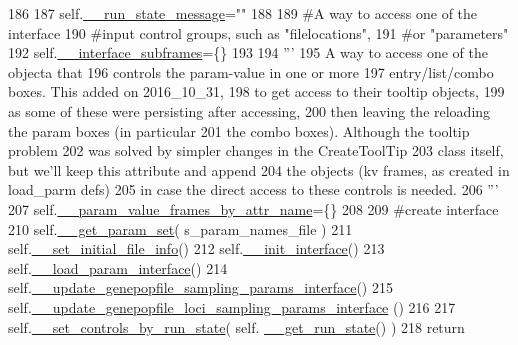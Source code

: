 \begin{DoxyCode}
186 
187         self.\hyperlink{classnegui_1_1pgguineestimator__experimental_1_1PGGuiNeEstimator_adc90b53fb2b4c9aefbcc0391ce7451d7}{\_\_run\_state\_message}=\textcolor{stringliteral}{""}
188 
189         \textcolor{comment}{#A way to access one of the interface}
190         \textcolor{comment}{#input control groups, such as "filelocations",}
191         \textcolor{comment}{#or "parameters"}
192         self.\hyperlink{classnegui_1_1pgguineestimator__experimental_1_1PGGuiNeEstimator_a363d1b1d4e38372e920f732bfe834b5c}{\_\_interface\_subframes}=\{\}
193 
194         \textcolor{stringliteral}{'''}
195 \textcolor{stringliteral}{        A way to access one of the objecta that}
196 \textcolor{stringliteral}{        controls the param-value in one or more }
197 \textcolor{stringliteral}{        entry/list/combo boxes.  This added on 2016\_10\_31, }
198 \textcolor{stringliteral}{        to get access to their tooltip objects,         }
199 \textcolor{stringliteral}{        as some of these were persisting after accessing,}
200 \textcolor{stringliteral}{        then leaving the reloading the param boxes (in particular}
201 \textcolor{stringliteral}{        the combo boxes). Although the tooltip problem}
202 \textcolor{stringliteral}{        was solved by simpler changes in the CreateToolTip}
203 \textcolor{stringliteral}{        class itself, but we'll keep this attribute and append}
204 \textcolor{stringliteral}{        the objects (kv frames, as created in load\_parm defs)}
205 \textcolor{stringliteral}{        in case the direct access to these controls is needed.}
206 \textcolor{stringliteral}{        '''}
207         self.\hyperlink{classnegui_1_1pgguineestimator__experimental_1_1PGGuiNeEstimator_a2073af7a95f481ec2c9ff7e6ebd88cc8}{\_\_param\_value\_frames\_by\_attr\_name}=\{\}
208 
209         \textcolor{comment}{#create interface}
210         self.\hyperlink{classnegui_1_1pgguineestimator__experimental_1_1PGGuiNeEstimator_a92ed421bb725480d11cfcf18265e6d7c}{\_\_get\_param\_set}( s\_param\_names\_file )
211         self.\hyperlink{classnegui_1_1pgguineestimator__experimental_1_1PGGuiNeEstimator_a7977b79271c398d9fe901b4fe926b5ed}{\_\_set\_initial\_file\_info}()
212         self.\hyperlink{classnegui_1_1pgguineestimator__experimental_1_1PGGuiNeEstimator_a2b7e06e2b53c101c2d2363c922bce129}{\_\_init\_interface}()
213         self.\hyperlink{classnegui_1_1pgguineestimator__experimental_1_1PGGuiNeEstimator_a837749bf5dc113fac16e84e09852a3b5}{\_\_load\_param\_interface}()
214         self.\hyperlink{classnegui_1_1pgguineestimator__experimental_1_1PGGuiNeEstimator_a2b8aac1608bcf4cb91d46f23345ffbbe}{\_\_update\_genepopfile\_sampling\_params\_interface}()
215         self.\hyperlink{classnegui_1_1pgguineestimator__experimental_1_1PGGuiNeEstimator_a55683e0220823fdb0663e4b08e042cf2}{\_\_update\_genepopfile\_loci\_sampling\_params\_interface}
      ()
216         
217         self.\hyperlink{classnegui_1_1pgguineestimator__experimental_1_1PGGuiNeEstimator_a4f894c66d178e1c34e805def6d7c4f30}{\_\_set\_controls\_by\_run\_state}( self.
      \hyperlink{classnegui_1_1pgguineestimator__experimental_1_1PGGuiNeEstimator_ae85f6ae9ee8842a94eae2d5025f328fc}{\_\_get\_run\_state}() )
218         \textcolor{keywordflow}{return}
\end{DoxyCode}


